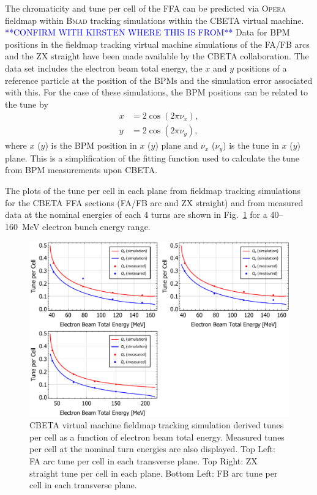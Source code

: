 \documentclass[../main.tex]{subfiles}
\begin{document}
The chromaticity and tune per cell of the FFA can be predicted via \textsc{Opera} fieldmap within \textsc{Bmad} tracking simulations within the CBETA virtual machine. \textcolor{blue}{**CONFIRM WITH KIRSTEN WHERE THIS IS FROM**} Data for BPM positions in the fieldmap tracking virtual machine simulations of the FA/FB arcs and the ZX straight have been made available by the CBETA collaboration. The data set includes the electron beam total energy, the $x$ and $y$ positions of a reference particle at the position of the BPMs and the simulation error associated with this. For the case of these simulations, the BPM positions can be related to the tune by 
\begin{align}
x &= 2\cos\left(2\pi\nu_{x}\right), \\
y &= 2\cos\left(2\pi\nu_{y}\right),
\label{eq:bpm_tune_conversion_fieldmap}
\end{align}
where $x$ ($y$) is the BPM position in $x$ ($y$) plane and $\nu_{x}$ ($\nu_{y}$) is the tune in $x$ ($y$) plane. This is a simplification of the fitting function \cite{gulliford2019beam} used to calculate the tune from BPM measurements upon CBETA.

The plots of the tune per cell in each plane from fieldmap tracking simulations for the CBETA FFA sections (FA/FB arc and ZX straight) and from measured data at the nominal energies of each 4 turns are shown in Fig.~\ref{fig:fieldmap_chromaticity_tune} for a 40--160~\si{\mega\electronvolt} electron bunch energy range.
\begin{figure}[!h]
\centering
\includegraphics[width=\textwidth]{Figures/CBETA_Multi-Pass_Commissioning/chromaticity/FAFBZX_nominal_tunes.pdf}
\caption{CBETA virtual machine fieldmap tracking simulation derived tunes per cell as a function of electron beam total energy. Measured tunes per cell at the nominal turn energies are also displayed. Top Left: FA arc tune per cell in each transverse plane. Top Right: ZX straight tune per cell in each plane. Bottom Left: FB arc tune per cell in each transverse plane. }
\label{fig:fieldmap_chromaticity_tune}
\end{figure}
\end{document}
